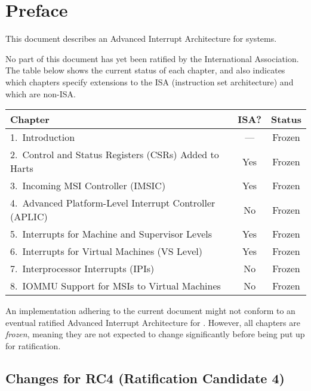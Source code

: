 
\chapter{Preface}

This document describes an Advanced Interrupt Architecture
for {\RISCV} systems.

No part of this document has yet been ratified
by the {\RISCV} International Association.
The table below shows the current status of each chapter,
and also indicates which chapters specify extensions to the
{\RISCV} ISA (instruction set architecture) and which are non-ISA.

{
\begin{table}[hbt]
\centering
\begin{tabular}{|l|c|c|}
\hline
Chapter                                                  & ISA? & Status \\
\hline
\hline
1.\ Introduction                                         & ---  & Frozen \\
2.\ Control and Status Registers (CSRs) Added to Harts   & Yes  & Frozen \\
3.\ Incoming MSI Controller (IMSIC)                      & Yes  & Frozen \\
4.\ Advanced Platform-Level Interrupt Controller (APLIC) & No   & Frozen \\
5.\ Interrupts for Machine and Supervisor Levels         & Yes  & Frozen \\
6.\ Interrupts for Virtual Machines (VS Level)           & Yes  & Frozen \\
7.\ Interprocessor Interrupts (IPIs)                     & No   & Frozen \\
8.\ IOMMU Support for MSIs to Virtual Machines           & No   & Frozen \\
\hline
\end{tabular}
\end{table}
}

An implementation adhering to the current document might not conform
to an eventual ratified Advanced Interrupt Architecture for {\RISCV}.
However, all chapters are \emph{frozen}, meaning they are not expected
to change significantly before being put up for ratification.

\section*{Changes for RC4 (Ratification Candidate 4)}

